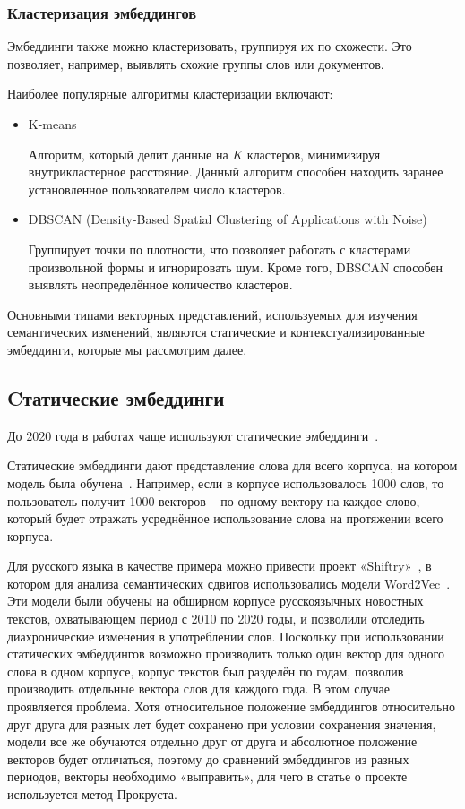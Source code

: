 \documentclass[LI,VKR]{HSEUniversity}
\begin{document}
\subsubsection*{Кластеризация эмбеддингов}

Эмбеддинги также можно кластеризовать, группируя их по схожести.
Это позволяет, например, выявлять схожие группы слов или документов.

Наиболее популярные алгоритмы кластеризации включают:

\begin{itemize}
    \item K-means

Алгоритм, который делит данные на \(K\) кластеров, минимизируя внутрикластерное расстояние.
Данный алгоритм способен находить заранее установленное пользователем число кластеров.
    \item DBSCAN (Density-Based Spatial Clustering of Applications with Noise)

Группирует точки по плотности, что позволяет работать с кластерами произвольной формы и игнорировать шум.
Кроме того, DBSCAN способен выявлять неопределённое количество кластеров.
\end{itemize}

Основными типами векторных представлений, используемых для изучения семантических изменений,
являются статические и контекстуализированные эмбеддинги,
которые мы рассмотрим далее.

\subsection{Cтатические эмбеддинги}

До 2020 года в работах чаще используют статические эмбеддинги~\cite{TahmasebiComputationalApproachesToSemanticChange}.

Статические эмбеддинги дают представление слова для всего корпуса,
на котором модель была обучена~\cite{TahmasebiComputationalApproachesToSemanticChange}.
Например, если в корпусе использовалось 1000 слов, то пользователь получит 1000 векторов –
по одному вектору на каждое слово, который будет отражать усреднённое использование
слова на протяжении всего корпуса.

Для русского языка в качестве примера можно привести проект «Shiftry»~\cite{shiftry},
в котором для анализа семантических сдвигов использовались модели Word2Vec~\cite{Word2VecModelAnalysis}.
Эти модели были обучены на обширном корпусе русскоязычных новостных текстов,
охватывающем период с 2010 по 2020 годы, и позволили отследить диахронические изменения
в употреблении слов.
Поскольку при использовании статических эмбеддингов возможно производить
только один вектор для одного слова в одном корпусе,
корпус текстов был разделён по годам,
позволив производить отдельные вектора слов для каждого года.
В этом случае проявляется проблема.
Хотя относительное положение эмбеддингов относительно друг друга для разных
лет будет сохранено при условии сохранения значения,
модели все же обучаются отдельно друг от друга и абсолютное положение векторов будет отличаться,
поэтому до сравнений эмбеддингов из разных периодов, векторы необходимо «выправить»,
для чего в статье о проекте используется метод Прокруста.
\end{document}
